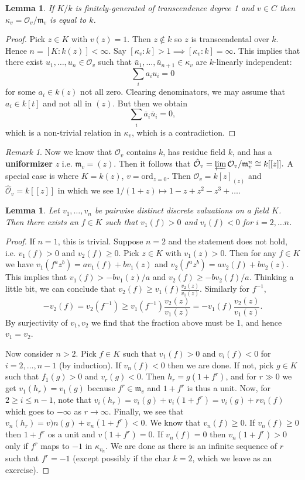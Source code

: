 \documentclass{article}
\newcommand{\fr}{\mathfrak}
\theoremstyle{plain}
\newtheorem{lem}[thm]{Lemma}
\theoremstyle{definition}
\theoremstyle{remark}
\newtheorem*{rem}{Remark}
\begin{document}
\begin{lem}
\label{L69}
If $K/k$ is finitely-generated of transcendence degree 1 and $v\in C$ then $\kappa_v=\mathcal{O}_v/\fr m_v$ is equal to $k$.
\end{lem}
\begin{proof}
Pick $z\in K$ with $v(z)=1$. Then $z\notin k$ so $z$ is transcendental over $k$. Hence $n=[K:k(z)]<\infty$. Say $[\kappa_v:k]>1\implies [\kappa_v:k]=\infty$. This implies that there exist $u_1,\ldots,u_n\in\mathcal{O}_v$ such that $\bar u_1,\ldots,\bar u_{n+1}\in\kappa_v$ are $k$-linearly independent:
\[\sum_i a_i u_i=0\]
for some $a_i\in k(z)$ not all zero. Clearing denominators, we may assume that $a_i\in k[t]$ and not all in $(z)$. But then we obtain
\[\sum_i \bar a_i \bar u_i=0,\]
which is a non-trivial relation in $\kappa_v$, which is a contradiction.
\end{proof}

\begin{rem}
Now we know that $\mathcal{O}_v$ contains $k$, has residue field $k$, and has a \textbf{uniformizer} $z$ i.e. $\fr m_v=(z)$. Then it follows that $\hat{\mathcal{O}}_v=\varprojlim \mathcal{O}_v/\fr m_v^n\cong k[[z]].$ A special case is where $K=k(z)$, $v=\text{ord}_{z=0}$. Then $\mathcal{O}_v=k[z]_{(z)}$ and $\hat{\mathcal{O}}_v=k[[z]]$ in which we see $1/(1+z)\mapsto 1-z+z^2-z^3+\ldots$.
\end{rem}


\begin{lem}
\label{L70}
Let $v_1,\ldots,v_n$ be pairwise distinct discrete valuations on a field $K$. Then there exists an $f\in K$ such that $v_1(f)>0$ and $v_i(f)<0$ for $i=2,\ldots n$.
\end{lem}
\begin{proof}
If $n=1$, this is trivial. Suppose $n=2$ and the statement does not hold, i.e.
$v_1(f)>0$ and $v_2(f)\geq 0$. Pick $z\in K$ with $v_1(z)>0$. Then for any $f\in K$ we have $v_1(f^az^b)=av_1(f)+bv_1(z)$ and $v_2(f^az^b)=av_2(f)+bv_2(z)$. This implies that $v_1(f)>-bv_1(z)/a$ and $v_2(f)\geq -bv_2(f)/a$. Thinking a little bit, we can conclude that $v_2(f)\geq v_1(f)\frac{v_2(z)}{v_1(z)}$. Similarly for $f^{-1}$,
\[-v_2(f)=v_2(f^{-1})\geq v_1(f^{-1})\frac{v_2(z)}{v_1(z)}=-v_1(f)\frac{v_2(z)}{v_1(z)}.\]
By surjectivity of $v_1,v_2$ we find that the fraction above must be 1, and hence $v_1=v_2$.

Now consider $n>2$. Pick $f\in K$ such that $v_1(f)>0$ and $v_i(f)<0$ for $i=2,\ldots,n-1$ (by induction). If $v_n(f)<0$ then we are done. If not, pick $g\in K$ such that $f_1(g)>0$ and $v_r(g)<0$. Then $h_r=g(1+f^r)$, and for $r\gg 0$ we get $v_1(h_r)=v_1(g)$ because $f^r\in\fr m_v$ and $1+f^r$ is thus a unit. Now, for $2\geq i\leq n-1$, note that $v_i(h_r)=v_i(g)+v_i(1+f^r)=v_i(g)+rv_i(f)$ which goes to $-\infty$ as $r\to\infty$. Finally, we see that $v_n(h_r)=v)n(g)+v_n(1+f^r)<0$. We know that $v_n(f)\geq 0$. If $v_n(f)\geq 0$ then $1+f^r$ os a unit and $v(1+f^r)=0$. If $v_n(f)=0$ then $v_n(1+f^r)>0$ only if $f^r$ maps to $-1$ in $\kappa_{v_n}$. We are done as there is an infinite sequence of $r$ such that $f^r=-1$ (except possibly if the $\text{char }k=2$, which we leave as an exercise).
\end{proof}
\end{document}

